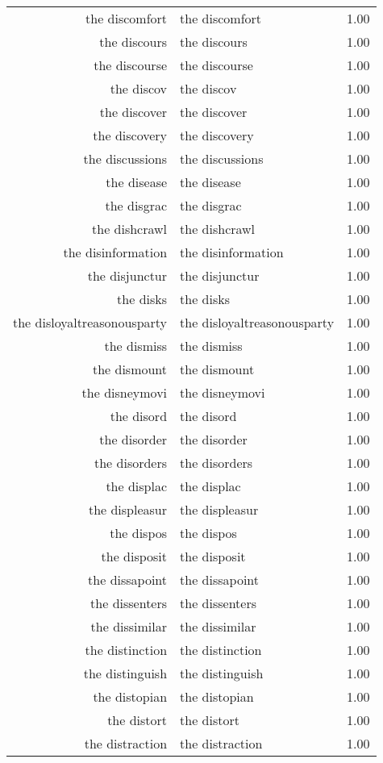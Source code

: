 \begin{table}[ht]
\begin{tabular}{rlr}
  the discomfort & the discomfort & 1.00 \\ 
  the discours & the discours & 1.00 \\ 
  the discourse & the discourse & 1.00 \\ 
  the discov & the discov & 1.00 \\ 
  the discover & the discover & 1.00 \\ 
  the discovery & the discovery & 1.00 \\ 
  the discussions & the discussions & 1.00 \\ 
  the disease & the disease & 1.00 \\ 
  the disgrac & the disgrac & 1.00 \\ 
  the dishcrawl & the dishcrawl & 1.00 \\ 
  the disinformation & the disinformation & 1.00 \\ 
  the disjunctur & the disjunctur & 1.00 \\ 
  the disks & the disks & 1.00 \\ 
  the disloyaltreasonousparty & the disloyaltreasonousparty & 1.00 \\ 
  the dismiss & the dismiss & 1.00 \\ 
  the dismount & the dismount & 1.00 \\ 
  the disneymovi & the disneymovi & 1.00 \\ 
  the disord & the disord & 1.00 \\ 
  the disorder & the disorder & 1.00 \\ 
  the disorders & the disorders & 1.00 \\ 
  the displac & the displac & 1.00 \\ 
  the displeasur & the displeasur & 1.00 \\ 
  the dispos & the dispos & 1.00 \\ 
  the disposit & the disposit & 1.00 \\ 
  the dissapoint & the dissapoint & 1.00 \\ 
  the dissenters & the dissenters & 1.00 \\ 
  the dissimilar & the dissimilar & 1.00 \\ 
  the distinction & the distinction & 1.00 \\ 
  the distinguish & the distinguish & 1.00 \\ 
  the distopian & the distopian & 1.00 \\ 
  the distort & the distort & 1.00 \\ 
  the distraction & the distraction & 1.00 \\ 

\end{tabular}
\end{table}
